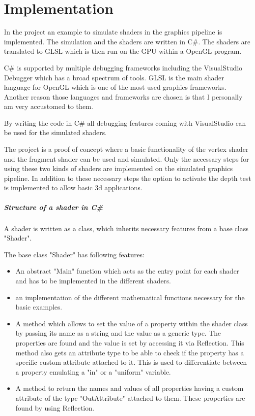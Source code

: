
\chapter{Implementation}\label{cha:Implementation}

In the project  an example to simulate shaders in the graphics pipeline is implemented. The simulation and the shaders are written in C\#. The shaders are translated to GLSL which is then run on the GPU within a OpenGL program.

C\# is supported by multiple debugging frameworks including the VisualStudio Debugger which has a broad spectrum of tools.  GLSL is the main shader language for OpenGL which is one of the most used graphics frameworks. 
Another reason those languages and frameworks are chosen is that I personally am very accustomed to them.

By writing the code in C\# all debugging features coming with VisualStudio can be used for the simulated shaders.

The project is a proof of concept where a basic functionality of the vertex shader and the fragment shader can be used and simulated. Only the necessary steps for using these two kinds of shaders are implemented on the simulated graphics pipeline. In addition to these necessary steps the option to activate the depth test is implemented to allow basic 3d applications.

\paragraph{Structure of a shader in C\#}

A shader is written as a class, which inherits necessary features from a base class "Shader".

The base class "Shader" has following features:
\begin{itemize}
\item An abstract "Main" function which acts as the entry point for each shader and has to be implemented in the different shaders.
\item an implementation of the different mathematical functions necessary for the basic examples.
\item A method which allows to set the value of a property within the shader class by passing its name as a string and the value as a generic type. The properties are found and the value is set by accessing it via Reflection. This method also gets an attribute type to be able to check if the property has a specific custom attribute attached to it. This is used to differentiate between a property emulating a "in" or a "uniform" variable.
\item A method to return the names and values of all properties having a custom attribute of the type "OutAttribute" attached to them. These properties are found by using Reflection.
\end{itemize}

